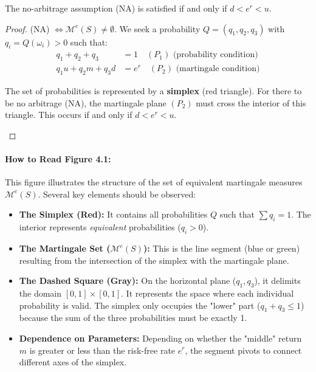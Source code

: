 \begin{proposition}
The no-arbitrage assumption (NA) is satisfied if and only if $d < e^r < u$.
\end{proposition}

\begin{proof}

(NA) $\iff \mathcal{M}^e(S) \neq \emptyset$. We seek a probability $Q=(q_1, q_2, q_3)$ with $q_i = Q(\omega_i) > 0$ such that:
\begin{align}
    q_1 + q_2 + q_3 &= 1 \quad (P_1) \text{ (probability condition)} \\
    q_1 u + q_2 m + q_3 d &= e^r \quad (P_2) \text{ (martingale condition)}
\end{align}

\begin{tcolorbox}[title=Geometric Visualization of Arbitrage, colback=yellow!10!white, colframe=yellow!50!black]
The set of probabilities is represented by a \textbf{simplex} (red triangle). For there to be no arbitrage (NA), the martingale plane $(P_2)$ must cross the interior of this triangle. This occurs if and only if $d < e^r < u$.
\end{tcolorbox}
\end{proof}

\paragraph{How to Read Figure 4.1:}
This figure illustrates the structure of the set of equivalent martingale measures $\mathcal{M}^e(S)$. Several key elements should be observed:
\begin{itemize}
    \item \textbf{The Simplex (Red):} It contains all probabilities $Q$ such that $\sum q_i = 1$. The interior represents \textit{equivalent} probabilities ($q_i > 0$).
    \item \textbf{The Martingale Set ($\mathcal{M}^e(S)$):} This is the line segment (blue or green) resulting from the intersection of the simplex with the martingale plane.
    \item \textbf{The Dashed Square (Gray):} On the horizontal plane ($q_1, q_3$), it delimits the domain $[0,1] \times [0,1]$. It represents the space where each individual probability is valid. The simplex only occupies the "lower" part ($q_1+q_3 \le 1$) because the sum of the three probabilities must be exactly 1.
    \item \textbf{Dependence on Parameters:} Depending on whether the "middle" return $m$ is greater or less than the risk-free rate $e^r$, the segment pivots to connect different axes of the simplex.
\end{itemize}

